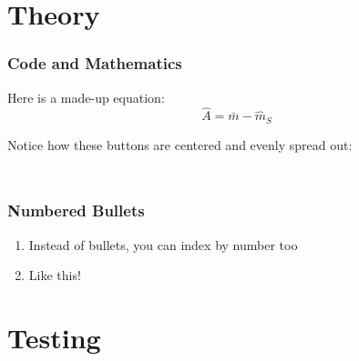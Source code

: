\section{Theory}

\begin{frame}
\label{Maths}
	\frametitle{Code and Mathematics}
		
        Here is a made-up equation:
        $$ \hat{A} = \bar{m}-\hat{m}_S$$ \newline

        Notice how these buttons are centered and evenly spread out:\newline

        \begin{columns}[t] %
		\begin{column}{0.25\textwidth} %
                \hyperlink{Terms}{}
		\end{column}
  		\begin{column}{0.25\textwidth} %
                \hyperlink{Code}{}
		\end{column}
            \begin{column}{0.25\textwidth} %
                \hyperlink{Theorems}{}
		\end{column}
	\end{columns}
        
\end{frame}

\begin{frame}
	\frametitle{Numbered Bullets}
            \begin{enumerate}
                \item Instead of bullets, you can index by number too \newline
                \item Like this!
            \end{enumerate}
\end{frame}

\section{Testing}

